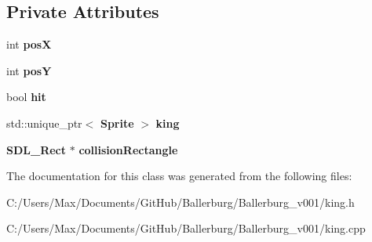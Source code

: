 \subsection*{Private Attributes}
\begin{DoxyCompactItemize}
\item 
int {\bfseries pos\+X}\label{class_king_a577f46e8f16167dfca5ca1a8858fe365}

\item 
int {\bfseries pos\+Y}\label{class_king_a85d49cd1d68f0296a1f43e1708453abd}

\item 
bool {\bfseries hit}\label{class_king_a03651a8a66143d64f10f9f3df00a4629}

\item 
std\+::unique\+\_\+ptr$<$ {\bf Sprite} $>$ {\bfseries king}\label{class_king_a9bc87addaf51d5efe880ca7ba8087e87}

\item 
{\bf S\+D\+L\+\_\+\+Rect} $\ast$ {\bfseries collision\+Rectangle}\label{class_king_a33d9a98230662f73e2bb396d7f7218dd}

\end{DoxyCompactItemize}


The documentation for this class was generated from the following files\+:\begin{DoxyCompactItemize}
\item 
C\+:/\+Users/\+Max/\+Documents/\+Git\+Hub/\+Ballerburg/\+Ballerburg\+\_\+v001/king.\+h\item 
C\+:/\+Users/\+Max/\+Documents/\+Git\+Hub/\+Ballerburg/\+Ballerburg\+\_\+v001/king.\+cpp\end{DoxyCompactItemize}
